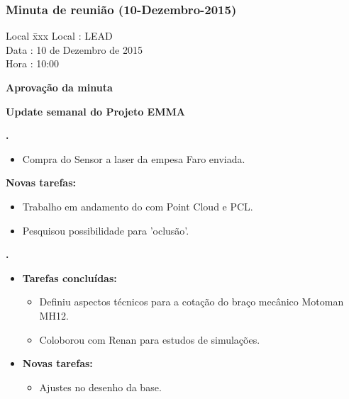 \subsubsection{Minuta de reunião (10-Dezembro-2015)}

\begin{tabbing}
  Local \= xxx \kill
  Local \> : LEAD \\
  Data  \> : 10 de Dezembro de 2015 \\
  Hora  \> : 10:00
\end{tabbing} 


\textbf{Aprovação da minuta}

\textbf{Update semanal do Projeto EMMA}
   									
						
\textbf{\gabriel.} 
	\begin{itemize}
			\item Compra do Sensor a laser da empesa Faro enviada.
			\end{itemize}
		
		\item \textbf{Novas tarefas:}
			\begin{itemize} 
				\item Trabalho em andamento do com Point Cloud e PCL.
				\item Pesquisou possibilidade para 'oclusão'.
			\end{itemize}

					
   \textbf{.} 
	\begin{itemize}
		\item \textbf{Tarefas concluídas:}
			\begin{itemize}    
			    \item Definiu aspectos técnicos para a cotação do braço mecânico
			    Motoman MH12.
			    \item Coloborou com Renan para estudos de simulações.
				
			\end{itemize}
		
		\item \textbf{Novas tarefas:}
			\begin{itemize} 
			    \item Ajustes no desenho da base.
			\end{itemize}
	\end{itemize}

